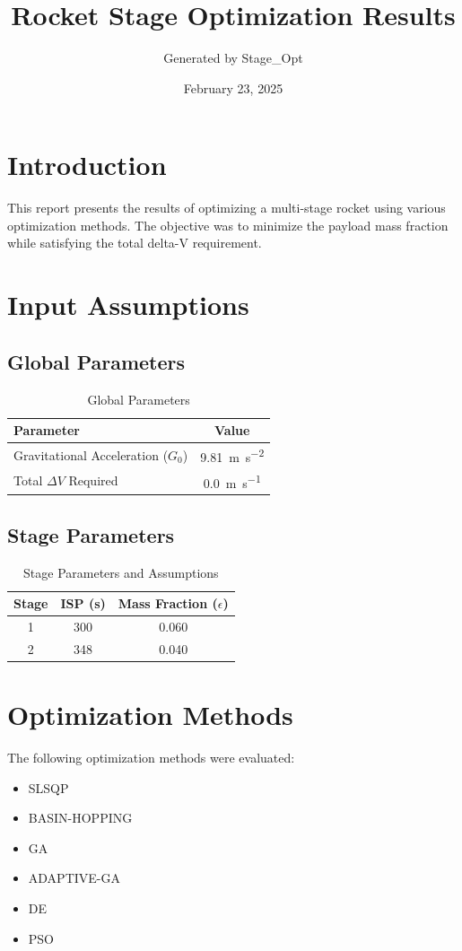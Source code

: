 \documentclass{article}
\title{Rocket Stage Optimization Results}
\author{Generated by Stage\_Opt}
\date{February 23, 2025}
\begin{document}
\maketitle

\section{Introduction}
This report presents the results of optimizing a multi-stage rocket using various optimization methods. The objective was to minimize the payload mass fraction while satisfying the total delta-V requirement.

\section{Input Assumptions}
\subsection{Global Parameters}
\begin{table}[H]
\centering
\caption{Global Parameters}
\begin{tabular}{lS[table-format=4.2]}
\toprule
Parameter & {Value} \\
\midrule
Gravitational Acceleration ($G_0$) & \SI{9.81}{\meter\per\second\squared} \\
Total $\Delta V$ Required & \SI{0.0}{\meter\per\second} \\
\bottomrule
\end{tabular}
\end{table}

\subsection{Stage Parameters}
\begin{table}[H]
\centering
\caption{Stage Parameters and Assumptions}
\begin{tabular}{cS[table-format=3.0]S[table-format=1.3]}
\toprule
Stage & {ISP (\si{\second})} & {Mass Fraction ($\epsilon$)} \\
 & 300 & 0.060 \\
2 & 348 & 0.040 \\
\bottomrule
\end{tabular}
\end{table}

\section{Optimization Methods}
The following optimization methods were evaluated:
\begin{itemize}
\item SLSQP
\item BASIN-HOPPING
\item GA
\item ADAPTIVE-GA
\item DE
\item PSO
\end{itemize}
\end{document}
